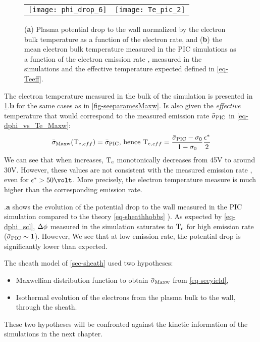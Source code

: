   \begin{figure}[hbt]
    \centering
    \begin{tabular}{@{} cc}
      \texttt{[image: phi\_drop\_6]}
      &
      \texttt{[image: Te\_pic\_2]}
    \end{tabular}
    \caption{({\bf a}) Plasma potential drop to the wall normalized by the electron bulk temperature as a function of the electron rate, and ({\bf b}) the mean electron bulk temperature measured in the \acs{PIC} simulations as a function of the electron emission rate \rate, measured in the simulations and the effective temperature expected defined in \cref{eq-Teeff}.  }
    \label{fig-Tevsproba}
  \end{figure}
  
  The electron temperature measured in the bulk of the simulation is presented in \cref{fig-Tevsproba}.{\bf b} for the same cases as in \cref{fig-seeparamesMaxw}.
  Is also given the \emph{effective} temperature that would correspond to the measured emission rate $ \bar{\sigma }_{\rm PIC}$ in \cref{eq-dphi_vs_Te_Maxw}\string:
  \begin{equation} \label{eq-Teeff}
      \bar{\sigma }_{\rm Maxw}(\mathrm{T_e}{}_{, eff}) =  \bar{\sigma }_{\rm PIC} \text{, hence } \mathrm{T_e}{}_{, eff} = \frac{ \bar{\sigma }_{\rm PIC} - \sigma_0}{1 - \sigma_0} \frac{\epsilon^{*}}{2}
  \end{equation}
  We can see that when \rate increases, $\mathrm{T_e}$ monotonically decreases from 45V to around 30V.
  However, these values are not consistent with the measured emission rate \ratepic, even for $\crover > 50\volt$.
  More precisely, the electron temperature measure is much higher than the corresponding emission rate.

  .{\bf a} shows the evolution of the potential drop to the wall measured in the \ac{PIC} simulation compared to the theory  \cref{eq-sheathhobbs} ).
  As expected by \cref{eq-dphi_scl}, $\Delta \phi$ measured in the simulation saturates to $\mathrm{T_e}$ for high emission rate ($ \bar{\sigma }_{\rm PIC} \sim 1$).
  However, 
  We see that at low emission rate, the potential drop is significantly lower than expected.
  
  The sheath model of \cref{sec-sheath} used two hypotheses\string:
  \begin{itemize}
    \item Maxwellian distribution function to obtain $ \bar{\sigma }_{\rm Maxw}$ from \cref{eq-seeyield},
    \item Isothermal evolution of the electrons from the plasma bulk to the wall, through the sheath.
  \end{itemize}
  These two hypotheses will be confronted against the kinetic information of the simulations in the next chapter.
